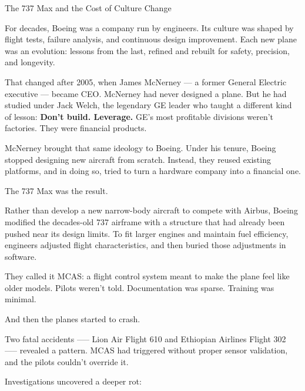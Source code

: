 \begin{HistoricalSidebar}{The 737 Max and the Cost of Culture Change}

  For decades, Boeing was a company run by engineers.  
  Its culture was shaped by flight tests, failure analysis, and continuous design improvement.  
  Each new plane was an evolution: lessons from the last, refined and rebuilt for safety, precision, and longevity.
  
  \medskip
  
  That changed after 2005, when James McNerney --- a former General Electric executive --- became CEO.  
  McNerney had never designed a plane. But he had studied under Jack Welch, the legendary GE leader who taught a 
  different kind of lesson:  
  \textbf{Don’t build. Leverage.}  
  GE’s most profitable divisions weren’t factories. They were financial products.
  
  \medskip
  
  McNerney brought that same ideology to Boeing.  
  Under his tenure, Boeing stopped designing new aircraft from scratch.  
  Instead, they reused existing platforms, and in doing so, tried to turn a hardware company into a financial one.
  
  \medskip
  
  The 737 Max was the result.
  
  \medskip
  
  Rather than develop a new narrow-body aircraft to compete with Airbus, Boeing modified the decades-old 737 airframe with 
  a structure that had already been pushed near its design limits.  
  To fit larger engines and maintain fuel efficiency, engineers adjusted flight characteristics, and then buried those 
  adjustments in software.
  
  \medskip
  
  They called it MCAS: a flight control system meant to make the plane feel like older models.  
  Pilots weren’t told. Documentation was sparse. Training was minimal.
  
  \medskip
  
  And then the planes started to crash.
  
  \medskip
  
  Two fatal accidents --— Lion Air Flight 610 and Ethiopian Airlines Flight 302 —-- revealed a pattern.  
  MCAS had triggered without proper sensor validation, and the pilots couldn’t override it.
  
  \medskip
  
  Investigations uncovered a deeper rot:  


\end{HistoricalSidebar}

